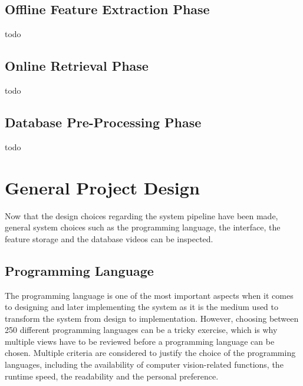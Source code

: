\subsection{Offline Feature Extraction Phase}
\label{sec:design-offline-feature-extraction}

todo

\subsection{Online Retrieval Phase}
\label{sec:design-online-retrieval}

todo

\subsection{Database Pre-Processing Phase}

todo

\section{General Project Design}

Now that the design choices regarding the system pipeline have been made, general system choices such as the programming language, the interface, the feature storage and the database videos can be inspected.

\subsection{Programming Language}

The programming language is one of the most important aspects when it comes to designing and later implementing the system as it is the medium used to transform the system from design to implementation. However, choosing between 250 different programming languages \cite{tiobe} can be a tricky exercise, which is why multiple views have to be reviewed before a programming language can be chosen. Multiple criteria are considered to justify the choice of the programming languages, including the availability of computer vision-related functions, the runtime speed, the readability and the personal preference.\\

